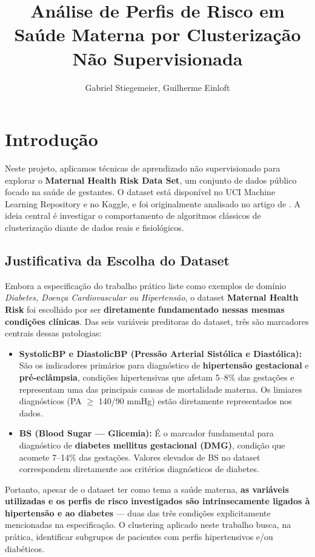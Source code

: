 \documentclass[12pt]{article}
\title{Análise de Perfis de Risco em Saúde Materna por Clusterização Não Supervisionada}
\author{Gabriel Stiegemeier\inst{1}, Guilherme Einloft\inst{1}}
\begin{document}
\maketitle



\section{Introdução}

Neste projeto, aplicamos técnicas de aprendizado não supervisionado para explorar o \textbf{Maternal Health Risk Data Set}, um conjunto de dados público focado na saúde de gestantes. O dataset está disponível no UCI Machine Learning Repository e no Kaggle, e foi originalmente analisado no artigo de \cite{ahmed2020review}. A ideia central é investigar o comportamento de algoritmos clássicos de clusterização diante de dados reais e fisiológicos.

\subsection{Justificativa da Escolha do Dataset}

Embora a especificação do trabalho prático liste como exemplos de domínio \textit{Diabetes, Doença Cardiovascular ou Hipertensão}, o dataset \textbf{Maternal Health Risk} foi escolhido por ser \textbf{diretamente fundamentado nessas mesmas condições clínicas}. Das seis variáveis preditoras do dataset, três são marcadores centrais dessas patologias:

\begin{itemize}
    \item \textbf{SystolicBP e DiastolicBP (Pressão Arterial Sistólica e Diastólica):} São os indicadores primários para diagnóstico de \textbf{hipertensão gestacional} e \textbf{pré-eclâmpsia}, condições hipertensivas que afetam 5--8\% das gestações e representam uma das principais causas de mortalidade materna. Os limiares diagnósticos (PA $\geq$ 140/90 mmHg) estão diretamente representados nos dados.
    \item \textbf{BS (Blood Sugar --- Glicemia):} É o marcador fundamental para diagnóstico de \textbf{diabetes mellitus gestacional (DMG)}, condição que acomete 7--14\% das gestações. Valores elevados de BS no dataset correspondem diretamente aos critérios diagnósticos de diabetes.
\end{itemize}

Portanto, apesar de o dataset ter como tema a saúde materna, \textbf{as variáveis utilizadas e os perfis de risco investigados são intrinsecamente ligados à hipertensão e ao diabetes} --- duas das três condições explicitamente mencionadas na especificação. O clustering aplicado neste trabalho busca, na prática, identificar subgrupos de pacientes com perfis hipertensivos e/ou diabéticos.
\end{document}
